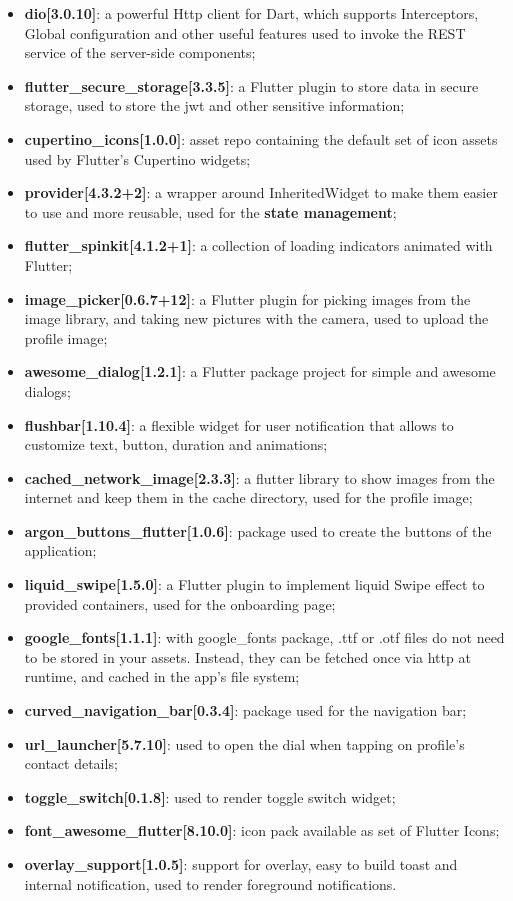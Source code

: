 \documentclass[../../dd.tex]{subfiles}
\begin{document}
    \begin{itemize}
        \item \textbf{dio[3.0.10]}: a powerful Http client for Dart, which supports Interceptors, Global configuration and other useful features used to invoke the REST service of the server-side components;
        \item \textbf{flutter\_secure\_storage[3.3.5]}: a Flutter plugin to store data in secure storage, used to store the jwt and other sensitive information;
        \item \textbf{cupertino\_icons[1.0.0]}: asset repo containing the default set of icon assets used by Flutter's Cupertino widgets;
        \item \textbf{provider[4.3.2+2]}:  a wrapper around InheritedWidget to make them easier to use and more reusable, used for the \textbf{state management};
        \item \textbf{flutter\_spinkit[4.1.2+1]}: a collection of loading indicators animated with Flutter;
        \item \textbf{image\_picker[0.6.7+12]}: a Flutter plugin for picking images from the image library, and taking new pictures with the camera, used to upload the profile image;
        \item \textbf{awesome\_dialog[1.2.1]}: a Flutter package project for simple and awesome dialogs;
        \item \textbf{flushbar[1.10.4]}: a flexible widget for user notification that allows to customize text, button, duration and animations;
        \item \textbf{cached\_network\_image[2.3.3]}: a flutter library to show images from the internet and keep them in the cache directory, used for the profile image;
        \item \textbf{argon\_buttons\_flutter[1.0.6]}: package used to create the buttons of the application;
        \item \textbf{liquid\_swipe[1.5.0]}: a Flutter plugin to implement liquid Swipe effect to provided containers, used for the onboarding page;
        \item \textbf{google\_fonts[1.1.1]}: with  google\_fonts package, .ttf or .otf files do not need to be stored in your assets. Instead, they can be fetched once via http at runtime, and cached in the app's file system;
        \item \textbf{curved\_navigation\_bar[0.3.4]}: package used for the navigation bar;
        \item \textbf{url\_launcher[5.7.10]}: used to open the dial when tapping on profile's contact details;
        \item \textbf{toggle\_switch[0.1.8]}: used to render toggle switch widget;
        \item \textbf{font\_awesome\_flutter[8.10.0]}: icon pack available as set of Flutter Icons;
        \item \textbf{overlay\_support[1.0.5]}: support for overlay, easy to build toast and internal notification, used to render foreground notifications.
    \end{itemize}
\end{document}
